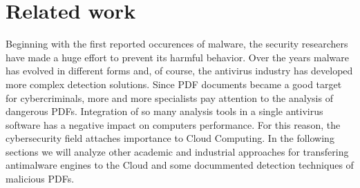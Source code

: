 \chapter{Related work}
\label{chapter:relatedWork}
Beginning with the first reported occurences of malware, the security researchers have made a huge effort to prevent its harmful behavior. Over the years malware has evolved in different forms and, of course, the antivirus industry has developed more complex detection solutions. Since PDF documents became a good target for cybercriminals, more and more specialists pay attention to the analysis of dangerous PDFs. Integration of so many analysis tools in a single antivirus software has a negative impact on computers performance. For this reason, the cybersecurity field attaches importance to Cloud Computing. In the following sections we will analyze other academic and industrial approaches for transfering antimalware engines to the Cloud and some docummented detection techniques of malicious PDFs.


